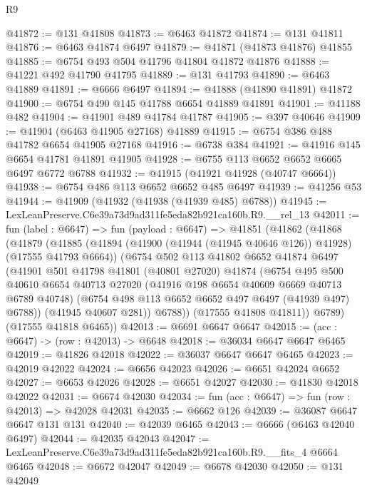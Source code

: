 \begin{lexlean}{R9}
\begin{coremodule}
@41872 := @131 @41808
@41873 := @6463 @41872
@41874 := @131 @41811
@41876 := @6463 @41874 @6497
@41879 := @41871 (@41873 @41876) @41855
@41885 := @6754 @493 @504 @41796 @41804 @41872 @41876
@41888 := @41221 @492 @41790 @41795
@41889 := @131 @41793
@41890 := @6463 @41889
@41891 := @6666 @6497
@41894 := @41888 (@41890 @41891) @41872
@41900 := @6754 @490 @145 @41788 @6654 @41889 @41891
@41901 := @41188 @482
@41904 := @41901 @489 @41784 @41787
@41905 := @397 @40646
@41909 := @41904 (@6463 @41905 @27168) @41889
@41915 := @6754 @386 @488 @41782 @6654 @41905 @27168
@41916 := @6738 @384
@41921 := @41916 @145 @6654 @41781 @41891 @41905
@41928 := @6755 @113 @6652 @6652 @6665 @6497 @6772 @6788
@41932 := @41915 (@41921 @41928 (@40747 @6664))
@41938 := @6754 @486 @113 @6652 @6652 @485 @6497
@41939 := @41256 @53
@41944 := @41909 (@41932 (@41938 (@41939 @485) @6788))
@41945 := LexLeanPreserve.C6e39a73d9ad311fe5eda82b921ca160b.R9.__rel_13
@42011 := fun (label : @6647) =>
  fun (payload : @6647) =>
  @41851
    (@41862
      (@41868
        (@41879
          (@41885
            (@41894 (@41900 (@41944 (@41945 @40646 @126)) @41928) (@17555 @41793 @6664))
            (@6754
              @502
              @113
              @41802
              @6652
              @41874
              @6497
              (@41901
                @501
                @41798
                @41801
                (@40801 @27020)
                @41874
                (@6754
                  @495
                  @500
                  @40610
                  @6654
                  @40713
                  @27020
                  (@41916 @198 @6654 @40609 @6669 @40713 @6789 @40748)
                  (@6754 @498 @113 @6652 @6652 @497 @6497 (@41939 @497) @6788))
                (@41945 @40607 @281))
              @6788))
          (@17555 @41808 @41811))
        @6789)
      (@17555 @41818 @6465))
@42013 := @6691 @6647 @6647
@42015 := (acc : @6647) -> (row : @42013) -> @6648
@42018 := @36034 @6647 @6647 @6465
@42019 := @41826 @42018
@42022 := @36037 @6647 @6647 @6465
@42023 := @42019 @42022
@42024 := @6656 @42023
@42026 := @6651 @42024 @6652
@42027 := @6653 @42026
@42028 := @6651 @42027
@42030 := @41830 @42018 @42022
@42031 := @6674 @42030
@42034 := fun (acc : @6647) => fun (row : @42013) => @42028 @42031
@42035 := @6662 @126
@42039 := @36087 @6647 @6647 @131 @131
@42040 := @42039 @6465
@42043 := @6666 (@6463 @42040 @6497)
@42044 := @42035 @42043
@42047 := LexLeanPreserve.C6e39a73d9ad311fe5eda82b921ca160b.R9.__fits_4 @6664 @6465
@42048 := @6672 @42047
@42049 := @6678 @42030
@42050 := @131 @42049

\end{coremodule}
\end{lexlean}
